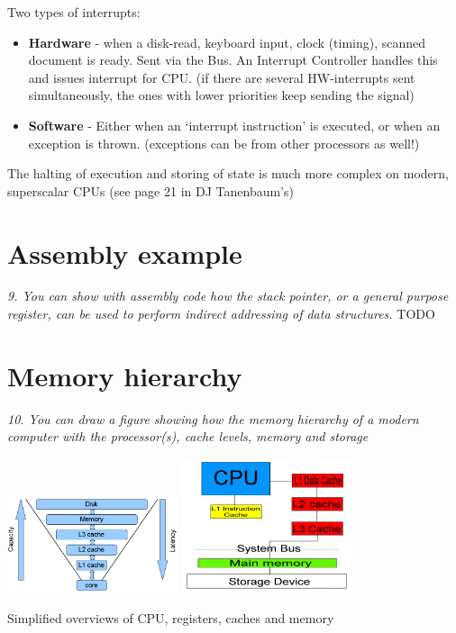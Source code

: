 \documentclass{article}
\begin{document}
Two types of interrupts:
\begin{itemize}
	\item \textbf{Hardware} - when a disk-read, keyboard input, clock (timing), scanned document is ready. Sent via the Bus.
	An Interrupt Controller handles this and issues interrupt for CPU.
	(if there are several HW-interrupts sent simultaneously, the ones with lower priorities keep sending the signal)

	\item \textbf{Software} - Either when an `interrupt instruction' is executed, or when an exception is thrown. (exceptions can be from other processors as well!)

\end{itemize}

The halting of execution and storing of state is much more complex on modern, superscalar CPUs (see page 21 in DJ Tanenbaum's)


\section{Assembly example}
\emph{9. You can show with assembly code how the stack pointer, or a general purpose register, can be used to perform indirect addressing of data structures.}
TODO


\section{Memory hierarchy}
\emph{10. You can draw a figure showing how the memory hierarchy of a modern computer with the processor(s), cache levels, memory and storage}

\begin{center}
\includegraphics[width=5.0cm]{images/cpu_cache_structure.png}
\includegraphics[width=5.0cm]{images/CPU-Cache-System.png}

Simplified overviews of CPU, registers, caches and memory
\end{center}
\end{document}
